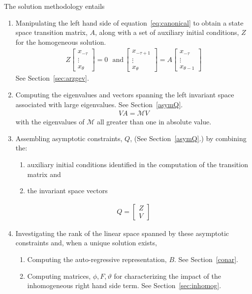 \documentclass[12pt]{article}
\begin{document}
The solution methodology entails 
\begin{enumerate}
\item Manipulating the left hand side of equation~\ref{eq:canonical} to obtain
 a state space transition matrix, $A$, along with
a set of auxiliary initial conditions, $Z$ for the homogeneous solution.
\begin{gather}
  Z
  \begin{bmatrix}
    x_{-\tau}\\ \vdots \\ x_{\theta}
  \end{bmatrix}=0 \,\,\,\,\text{and}\,   \begin{bmatrix}
    x_{-\tau+1}\\ \vdots \\ x_{\theta}
  \end{bmatrix}
=A   \begin{bmatrix}
    x_{-\tau}\\ \vdots \\ x_{\theta-1}
  \end{bmatrix}
\end{gather}
See Section~\ref{sec:arzgev}.
\item Computing the eigenvalues and vectors spanning 
the left invariant space associated with
large eigenvalues. See Section~\ref{asymQ}.
\begin{gather}
 V A =   \mathcal{M}  V 
\end{gather}
with the eigenvalues of $ \mathcal{M}$ all greater than one in absolute value.
\item Assembling asymptotic
constraints, $Q$, (See Section~\ref{asymQ}.)  by combining the:
  \begin{enumerate}
\item  auxiliary initial conditions identified in the computation of the transition matrix and 
\item the invariant space vectors
  \end{enumerate}
\begin{gather}
  Q= 
  \begin{bmatrix}
    Z\\V
  \end{bmatrix}
\end{gather}
\item Investigating the rank of the linear space spanned by these asymptotic
constraints and,  when a unique solution exists, 
\begin{enumerate}
\item Computing the auto-regressive 
representation, $B$. See Section~\ref{conar}.
\item Computing matrices, $\phi, F, \vartheta$ 
for characterizing the impact of the inhomogeneous
right hand side term. See Section~\ref{sec:inhomog}.
\end{enumerate}
\end{enumerate}
\end{document}
